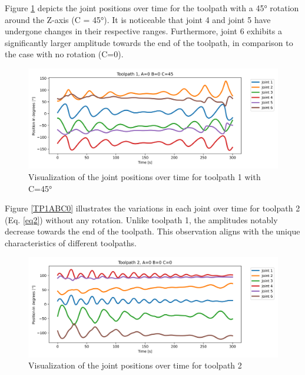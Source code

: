 Figure \ref{TP1ABC45} depicts the joint positions over time for the toolpath with a 45° rotation around the Z-axis (C = 45°). It is noticeable that joint 4 and joint 5 have undergone changes in their respective ranges. Furthermore, joint 6 exhibits a significantly larger amplitude towards the end of the toolpath, in comparison to the case with no rotation (C=0).

\begin{figure}[H]
	\centerline{\includegraphics[width=1\textwidth]{figures/TP1ABC45.png}}
	\caption{Visualization of the joint positions over time for toolpath 1 with C=45°}
	\label{TP1ABC45}
\end{figure}



Figure \ref{TP1ABC0} illustrates the variations in each joint over time for toolpath 2 (Eq. \ref{eq2}) without any rotation. Unlike toolpath 1, the amplitudes notably decrease towards the end of the toolpath. This observation aligns with the unique characteristics of different toolpaths.
 
\begin{figure}[H]
	\centerline{\includegraphics[width=1\textwidth]{figures/TP2ABC0.png}}
	\caption{Visualization of the joint positions over time for toolpath 2}
	\label{TP2ABC0}
\end{figure}

